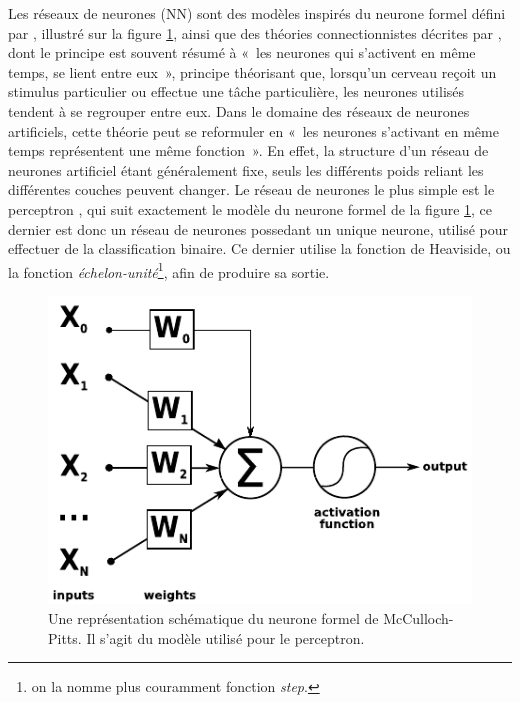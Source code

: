 \documentclass[PhD-Yoann-Dupont.tex]{subfiles}
\begin{document}
Les réseaux de neurones (NN) sont des modèles inspirés du neurone formel défini par \citet{mcculloch1943logical}, illustré sur la figure \ref{fig:mcculloch-pitts-neuron}, ainsi que des théories connectionnistes décrites par \citet{hebb1949organisation}, dont le principe est souvent résumé à «\ les neurones qui s'activent en même temps, se lient entre eux\ », principe théorisant que, lorsqu'un cerveau reçoit un stimulus particulier ou effectue une tâche particulière, les neurones utilisés tendent à se regrouper entre eux. Dans le domaine des réseaux de neurones artificiels, cette théorie peut se reformuler en «\ les neurones s'activant en même temps représentent une même fonction\ ». En effet, la structure d'un réseau de neurones artificiel étant généralement fixe, seuls les différents poids reliant les différentes couches peuvent changer. Le réseau de neurones le plus simple est le perceptron \citep{rosenblatt1958perceptron}, qui suit exactement le modèle du neurone formel de la figure \ref{fig:mcculloch-pitts-neuron}, ce dernier est donc un réseau de neurones possedant un unique neurone, utilisé pour effectuer de la classification binaire. Ce dernier utilise la fonction de Heaviside, ou la fonction \emph{échelon-unité}\footnote{on la nomme plus couramment fonction \emph{step}.}, afin de produire sa sortie.

\begin{figure}[ht!]
\centering
\includegraphics[scale=1.0]{images/NN/McCulloch-Pitts-neuron}
\caption{Une représentation schématique du neurone formel de McCulloch-Pitts. Il s'agit du modèle utilisé pour le perceptron.}
\label{fig:mcculloch-pitts-neuron}
\end{figure}
\end{document}
